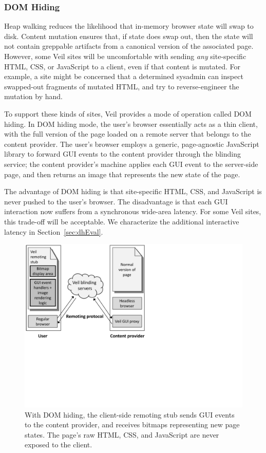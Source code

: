 \subsubsection{DOM Hiding}
\label{sec:domHiding}

Heap walking reduces the likelihood that in-memory browser
state will swap to disk. Content mutation ensures that, if
state does swap out, then the state will not contain greppable
artifacts from a canonical version of the associated page.
However, some Veil sites will be uncomfortable with sending
\emph{any} site-specific HTML, CSS, or JavaScript to a client,
even if that content is mutated. For example, a site might
be concerned that a determined sysadmin can inspect swapped-out
fragments of mutated HTML, and try to reverse-engineer the
mutation by hand.

To support these kinds of sites, Veil provides a mode of
operation called DOM hiding. In DOM hiding mode, the user's
browser essentially acts as a thin client, with the full
version of the page loaded on a remote server that belongs
to the content provider. The user's browser employs a generic,
page-agnostic JavaScript library to forward GUI events to
the content provider through the blinding service; the content
provider's machine applies each GUI event to the server-side
page, and then returns an image that represents the new state
of the page.

The advantage of DOM hiding is that site-specific HTML, CSS,
and JavaScript is never pushed to the user's browser. The
disadvantage is that each GUI interaction now suffers from
a synchronous wide-area latency. For some Veil sites,
this trade-off will be acceptable. We characterize the
additional interactive latency in Section~\ref{sec:dhEval}.

\begin{figure}
	\centering
	\includegraphics[width=\textwidth]{veil-figs/domHiding.pdf}
	\caption{With DOM hiding, the client-side remoting stub sends
		GUI events to the content provider, and receives bitmaps
		representing new page states. The page's raw HTML, CSS,
		and JavaScript are never exposed to the client.}
	\label{fig:domHiding}
\end{figure}

